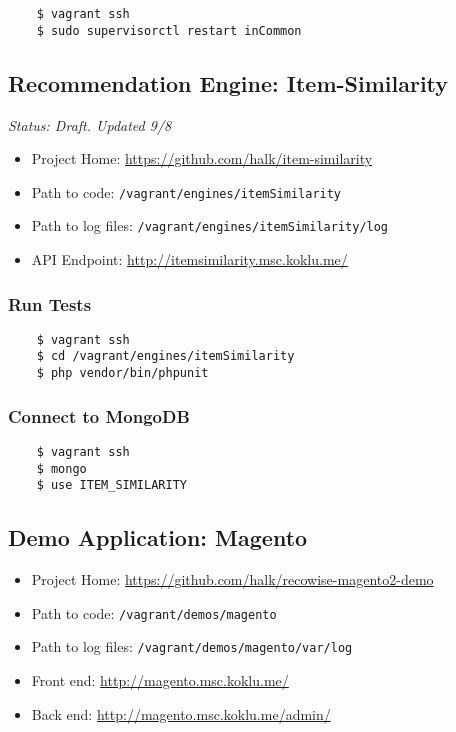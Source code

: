 \begin{verbatim}
    $ vagrant ssh
    $ sudo supervisorctl restart inCommon
\end{verbatim}


\subsection{Recommendation Engine: Item-Similarity}

\emph{Status: Draft. Updated 9/8}

\begin{itemize}
\item Project Home: \url{https://github.com/halk/item-similarity}
\item Path to code: \texttt{/vagrant/engines/itemSimilarity}
\item Path to log files: \texttt{/vagrant/engines/itemSimilarity/log}
\item API Endpoint: \url{http://itemsimilarity.msc.koklu.me/}
\end{itemize}

\subsubsection{Run Tests}

\begin{verbatim}
    $ vagrant ssh
    $ cd /vagrant/engines/itemSimilarity
    $ php vendor/bin/phpunit
\end{verbatim}

\subsubsection{Connect to MongoDB}

\begin{verbatim}
    $ vagrant ssh
    $ mongo
    $ use ITEM_SIMILARITY
\end{verbatim}



\subsection{Demo Application: Magento}

\begin{itemize}
\item Project Home: \url{https://github.com/halk/recowise-magento2-demo}
\item Path to code: \texttt{/vagrant/demos/magento}
\item Path to log files: \texttt{/vagrant/demos/magento/var/log}
\item Front end: \url{http://magento.msc.koklu.me/}
\item Back end: \url{http://magento.msc.koklu.me/admin/}
\end{itemize}

